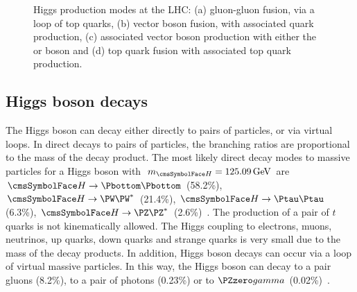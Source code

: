   \begin{figure}[h!]

  \centering
  \caption{Higgs production modes at the LHC: (a) gluon-gluon fusion, via a loop of top quarks, (b) vector boson fusion, with associated quark production, (c) associated vector boson production with either the \PZzero or \PW boson and (d) top quark fusion with associated top quark production. }
  \label{fig:theory:higgsproduction}
  \end{figure}

\subsection{Higgs boson decays}


The \SM Higgs boson can decay either directly to pairs of particles, or via virtual loops.
In direct decays to pairs of particles, the  branching ratios are proportional to the mass of the decay product. The most likely direct decay modes to massive particles for a \SM Higgs boson with $\mH=125.09\GeV$ are $\PH \rightarrow \Pbottom \Pbottom$ (58.2\%), $\PH \rightarrow \PW \PW^{*}$ (21.4\%), $\PH \rightarrow \Ptau \Ptau$ (6.3\%), $\PH \rightarrow \PZ \PZ^{*}$ (2.6\%)~\cite{LHCHXSWGRY4}. The production of a pair of $t$ quarks is not kinematically allowed. The Higgs coupling to electrons, muons, neutrinos, up quarks, down quarks and strange quarks is very small due to the mass of the decay products.
In addition, Higgs boson decays can occur via a loop of virtual massive particles. In this way, the Higgs boson can decay to a pair gluons (8.2\%), to a pair of photons (0.23\%) or to $\PZzero\gamma$ (0.02\%)~\cite{LHCHXSWGRY4}. 


